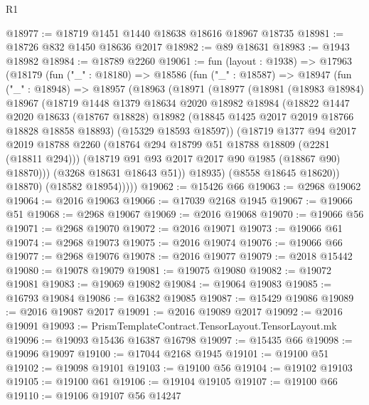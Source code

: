 \begin{lexlean}{R1}
\begin{coremodule}
@18977 := @18719 @1451 @1440 @18638 @18616 @18967 @18735
@18981 := @18726 @832 @1450 @18636 @2017
@18982 := @89 @18631
@18983 := @1943 @18982
@18984 := @18789 @2260
@19061 := fun (layout : @1938) =>
  @17963
    (@18179
      (fun ("_" : @18180) =>
      @18586
        (fun ("_" : @18587) =>
        @18947
          (fun ("_" : @18948) =>
          @18957
            (@18963
              (@18971
                (@18977
                  (@18981
                    (@18983 @18984)
                    @18967
                    (@18719
                      @1448
                      @1379
                      @18634
                      @2020
                      @18982
                      @18984
                      (@18822
                        @1447
                        @2020
                        @18633
                        (@18767 @18828)
                        @18982
                        (@18845 @1425 @2017 @2019 @18766 @18828 @18858 @18893)
                        (@15329 @18593 @18597))
                      (@18719
                        @1377
                        @94
                        @2017
                        @2019
                        @18788
                        @2260
                        (@18764 @294 @18799 @51 @18788 @18809 (@2281 (@18811 @294)))
                        (@18719 @91 @93 @2017 @2017 @90 @1985 (@18867 @90) @18870)))
                    (@3268 @18631 @18643 @51))
                  @18935)
                (@8558 @18645 @18620))
              @18870)
            (@18582 @18954)))))
@19062 := @15426 @66
@19063 := @2968 @19062
@19064 := @2016 @19063
@19066 := @17039 @2168 @1945
@19067 := @19066 @51
@19068 := @2968 @19067
@19069 := @2016 @19068
@19070 := @19066 @56
@19071 := @2968 @19070
@19072 := @2016 @19071
@19073 := @19066 @61
@19074 := @2968 @19073
@19075 := @2016 @19074
@19076 := @19066 @66
@19077 := @2968 @19076
@19078 := @2016 @19077
@19079 := @2018 @15442
@19080 := @19078 @19079
@19081 := @19075 @19080
@19082 := @19072 @19081
@19083 := @19069 @19082
@19084 := @19064 @19083
@19085 := @16793 @19084
@19086 := @16382 @19085
@19087 := @15429 @19086
@19089 := @2016 @19087 @2017
@19091 := @2016 @19089 @2017
@19092 := @2016 @19091
@19093 := PrismTemplateContract.TensorLayout.TensorLayout.mk
@19096 := @19093 @15436 @16387 @16798
@19097 := @15435 @66
@19098 := @19096 @19097
@19100 := @17044 @2168 @1945
@19101 := @19100 @51
@19102 := @19098 @19101
@19103 := @19100 @56
@19104 := @19102 @19103
@19105 := @19100 @61
@19106 := @19104 @19105
@19107 := @19100 @66
@19110 := @19106 @19107 @56 @14247

\end{coremodule}
\end{lexlean}
